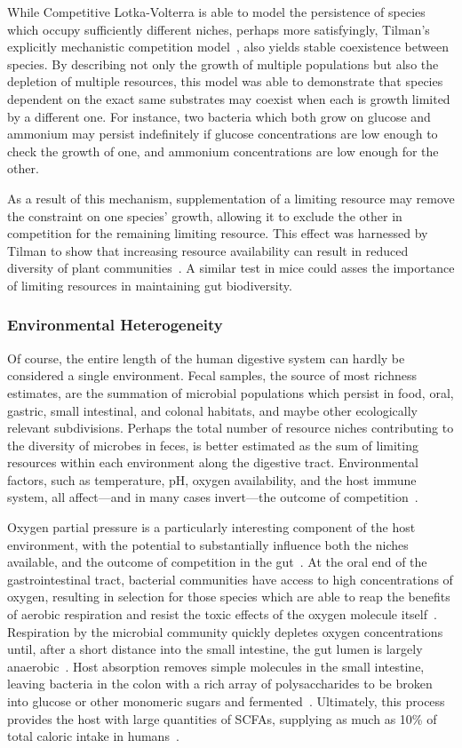 \documentclass[12pt]{article}
\begin{document}
While Competitive Lotka-Volterra is able to model the
persistence of species which occupy sufficiently different
niches,
perhaps more satisfyingly,
Tilman's explicitly mechanistic competition
model~\citep{Tilman1977},
also yields stable coexistence between species.
By describing not only the growth of multiple populations
but also the depletion of multiple resources,
this model was able to demonstrate that
species dependent on the exact same substrates may coexist
when each is growth limited by a different one.
For instance, two bacteria which both grow on glucose and
ammonium may persist indefinitely if glucose concentrations are
low enough to check the growth of one, and ammonium
concentrations are low enough for the other.

As a result of this mechanism, supplementation of a
limiting resource may remove the constraint on one species'
growth, allowing it to exclude the other in competition for
the remaining limiting resource.
This effect was harnessed by Tilman to show that increasing
resource availability can result in reduced diversity of
plant communities~\citep{Harpole2007}.
A similar test in mice could asses the importance of limiting
resources in maintaining gut biodiversity.

\subsubsection{Environmental Heterogeneity}
Of course, the entire length of the human digestive system can
hardly be considered a single environment.
Fecal samples, the source of most richness estimates, are the
summation of microbial populations which persist in
food, oral, gastric, small intestinal, and colonal habitats,
and maybe other ecologically relevant subdivisions.
Perhaps the total number of resource niches contributing
to the diversity of microbes in feces,
is better estimated as the sum of limiting resources
within each environment along the digestive tract.
Environmental factors, such as temperature, pH,
oxygen availability, and the host immune system,
all affect---and
in many cases invert---the outcome of competition~\citep{TODO}.

Oxygen partial pressure is a particularly interesting
component of the host environment, with the potential
to substantially influence both the niches available,
and the outcome of competition in the gut~\citep{Espey2013}.
At the oral end of the gastrointestinal tract, bacterial
communities have access to high concentrations of oxygen,
resulting in selection for those species which are able to
reap the benefits of aerobic respiration
and resist the toxic effects of the oxygen molecule itself~\citep{TODO}.
Respiration by the microbial community quickly depletes
oxygen concentrations until,
after a short distance into the small intestine,
the gut lumen is largely anaerobic~\citep{TODO}.
Host absorption removes simple molecules in the small
intestine,
leaving bacteria in the colon with a
rich array of polysaccharides to be broken into glucose or
other monomeric sugars and fermented~\citep[reviewed in][]{Macfarlane2012}.
Ultimately, this process provides the host with large
quantities of \glspl*{SCFA},
supplying as much as 10\% of total caloric intake in
humans~\citep{McNeil1984}.
\end{document}
